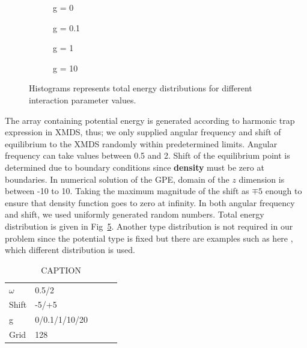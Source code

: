 \documentclass[a4paper,times,12pt]{article}
\begin{document}
\begin{figure}[H]
    \centering
    \begin{subfigure}[t]{0.45\textwidth}
        
        \caption{g = 0}
		\label{fig:a}
    \end{subfigure}
    \begin{subfigure}[t]{0.45\textwidth}
        
        \caption{g = 0.1}
		\label{fig:b}
    \end{subfigure}
    \begin{subfigure}[t]{0.45\textwidth}
        
        \caption{g = 1}
		\label{fig:c}
    \end{subfigure}
    \begin{subfigure}[t]{0.45\textwidth}
        
        \caption{g = 10}
		\label{fig:d}
    \end{subfigure}
    \caption{Histograms represents total energy distributions for different interaction parameter values.}
\label{fig:energy_dist}
\end{figure}


The array containing potential energy is generated according to harmonic trap expression in XMDS, thus; we only supplied angular frequency and shift of equilibrium to the XMDS randomly within predetermined limits. Angular frequency can take values between 0.5 and 2. Shift of the equilibrium point is determined due to boundary conditions since \textbf{density} must be zero at boundaries. In numerical solution of the GPE, domain of the $z$ dimension is between -10 to 10. Taking the maximum magnitude of the shift as $\mp 5$ enough to ensure that density function goes to zero at infinity. In both angular frequency and shift, we used uniformly generated random numbers. Total energy distribution is given in Fig~\ref{fig:energy_dist}. Another type distribution is not required in our problem since the potential type is fixed but there are examples such as here \cite{mills2017deep}, which different distribution is used.

\begin{table}[H]
\centering
\caption{CAPTION}
\label{my-label}
\begin{tabular}{lllll}
$\omega$ & 0.5/2         &  &  &  \\
Shift  & -5/+5         &  &  &  \\
g      & 0/0.1/1/10/20 &  &  &  \\
Grid   & 128           &  &  & 
\end{tabular}
\end{table}
\end{document}
